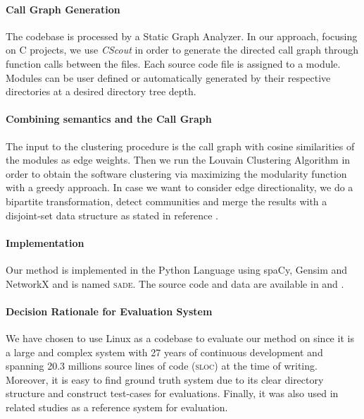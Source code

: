 \documentclass[sigconf,review, anonymous]{acmart}
\begin{document}
\paragraph{Call Graph Generation} 
The codebase is processed by a Static Graph Analyzer. 
In our approach, focusing on C projects, we use \emph{CScout} \cite{cscout} in order to generate the directed call graph through function calls between the files. 
Each source code file is assigned to a module. 
Modules can be user defined or automatically generated by their respective directories at a desired directory tree depth. 

\paragraph{Combining semantics and the Call Graph} 
The input to the clustering procedure
is the call graph with cosine similarities of the modules as edge weights.
Then we run the Louvain Clustering Algorithm \cite{louvain} in
order to obtain the software clustering via maximizing the modularity function with a greedy approach. 
In case we want to consider edge directionality, we do a bipartite transformation, detect communities and
merge the results with a disjoint-set data structure as stated in reference \cite{malliaros}.
    

\paragraph{Implementation}  
Our method is implemented in the Python Language using spaCy\cite{spacy}, Gensim \cite{gensim} and NetworkX \cite{nx} and is named \textsc{sade}. The source code and data are available in \cite{source_code} and \cite{call_graph}. 

\paragraph{Decision Rationale for Evaluation System} 
We have chosen to use Linux as a codebase to evaluate our method on 
since it is a large and complex system with 27 years of continuous development and spanning 20.3 millions source lines of code (\textsc{sloc}) at the time of writing.  
Moreover, it is easy to find ground truth system due to its clear directory structure and construct test-cases for
evaluations. 
Finally, it was also used in related studies \cite{acdc, evaluation} as a reference system for evaluation.  
\end{document}
